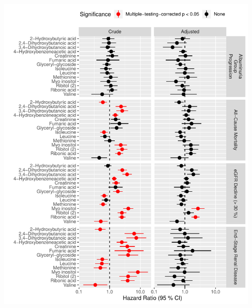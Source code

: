 \documentclass[]{article}
\begin{document}
\includegraphics{0033_PROFIL--Metabolomics_files/figure-latex/Surv-Compilation-Combined-From-All-Forest-Log-1.pdf}
\end{document}
